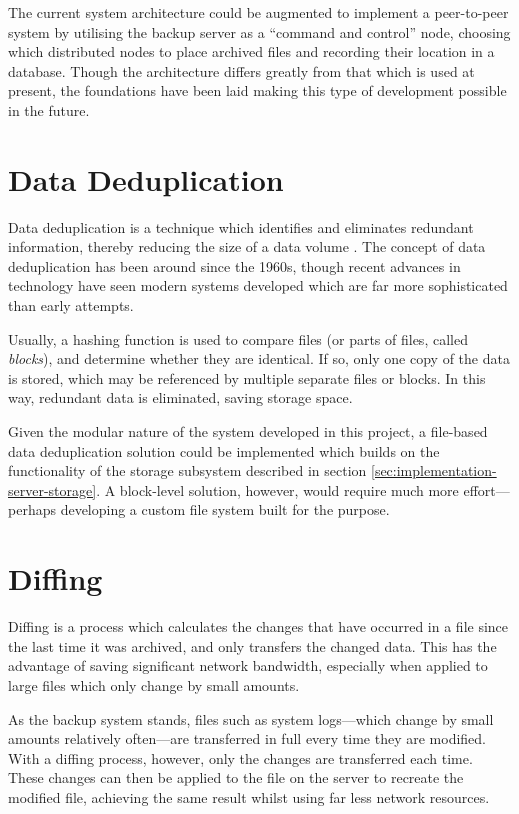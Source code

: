 The current system architecture could be augmented to implement a peer-to-peer
system by utilising the backup server as a ``command and control'' node,
choosing which distributed nodes to place archived files and recording their
location in a database. Though the architecture differs greatly from that which
is used at present, the foundations have been laid making this type of
development possible in the future.

\section{Data Deduplication}

Data deduplication is a technique which identifies and eliminates redundant
information, thereby reducing the size of a data volume \cite{geer2008}. The
concept of data deduplication has been around since the 1960s, though recent
advances in technology have seen modern systems developed which are far more
sophisticated than early attempts.

Usually, a hashing function is used to compare files (or parts of files, called
\emph{blocks}), and determine whether they are identical. If so, only one copy
of the data is stored, which may be referenced by multiple separate files or
blocks. In this way, redundant data is eliminated, saving storage space.

Given the modular nature of the system developed in this project, a file-based
data deduplication solution could be implemented which builds on the
functionality of the storage subsystem described in section
\ref{sec:implementation-server-storage}. A block-level solution, however, would
require much more effort---perhaps developing a custom file system built for
the purpose.

\section{Diffing}

Diffing is a process which calculates the changes that have occurred in a file
since the last time it was archived, and only transfers the changed data. This
has the advantage of saving significant network bandwidth, especially when
applied to large files which only change by small amounts.

As the backup system stands, files such as system logs---which change by small
amounts relatively often---are transferred in full every time they are
modified. With a diffing process, however, only the changes are transferred
each time. These changes can then be applied to the file on the server to
recreate the modified file, achieving the same result whilst using far less
network resources.
